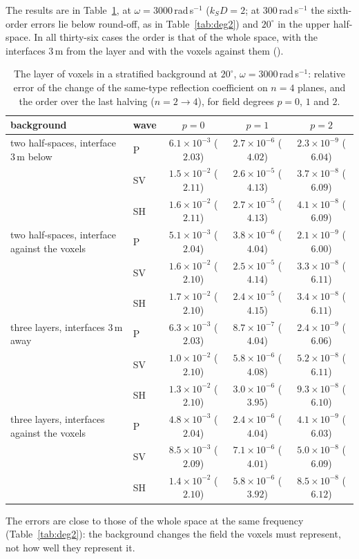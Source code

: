 \documentclass[preprint,review,12pt]{elsarticle}
\begin{document}
The results are in Table~\ref{tab:strat}, at $\omega=3000$\,rad\,s$^{-1}$ ($k_SD=2$; at
$300$\,rad\,s$^{-1}$ the sixth-order errors lie below round-off, as in Table~\ref{tab:deg2}) and
$20^\circ$ in the upper half-space. In all thirty-six cases the order is that of the whole space, with
the interfaces $3$\,m from the layer and with the voxels against them
().
\begin{table}[htbp]
\centering
\caption{The layer of voxels in a stratified background at $20^\circ$, $\omega=3000$\,rad\,s$^{-1}$:
relative error of the change of the same-type reflection coefficient on $n=4$ planes, and the order
over the last halving ($n=2\to4$), for field degrees $p=0$, $1$ and $2$.}\label{tab:strat}
\small\setlength{\tabcolsep}{4pt}
\begin{tabular}{@{}llccc@{}}
\toprule
background & wave & $p=0$ & $p=1$ & $p=2$ \\
\midrule
two half-spaces, interface $3$\,m below
 & P  & $6.1\times10^{-3}$ ($2.03$) & $2.7\times10^{-6}$ ($4.02$) & $2.3\times10^{-9}$ ($6.04$) \\
 & SV & $1.5\times10^{-2}$ ($2.11$) & $2.6\times10^{-5}$ ($4.13$) & $3.7\times10^{-8}$ ($6.09$) \\
 & SH & $1.6\times10^{-2}$ ($2.11$) & $2.7\times10^{-5}$ ($4.13$) & $4.1\times10^{-8}$ ($6.09$) \\
two half-spaces, interface against the voxels
 & P  & $5.1\times10^{-3}$ ($2.04$) & $3.8\times10^{-6}$ ($4.04$) & $2.1\times10^{-9}$ ($6.00$) \\
 & SV & $1.6\times10^{-2}$ ($2.10$) & $2.5\times10^{-5}$ ($4.14$) & $3.3\times10^{-8}$ ($6.11$) \\
 & SH & $1.7\times10^{-2}$ ($2.10$) & $2.4\times10^{-5}$ ($4.15$) & $3.4\times10^{-8}$ ($6.11$) \\
three layers, interfaces $3$\,m away
 & P  & $6.3\times10^{-3}$ ($2.03$) & $8.7\times10^{-7}$ ($4.04$) & $2.4\times10^{-9}$ ($6.06$) \\
 & SV & $1.0\times10^{-2}$ ($2.10$) & $5.8\times10^{-6}$ ($4.08$) & $5.2\times10^{-8}$ ($6.11$) \\
 & SH & $1.3\times10^{-2}$ ($2.10$) & $3.0\times10^{-6}$ ($3.95$) & $9.3\times10^{-8}$ ($6.10$) \\
three layers, interfaces against the voxels
 & P  & $4.8\times10^{-3}$ ($2.04$) & $2.4\times10^{-6}$ ($4.04$) & $4.1\times10^{-9}$ ($6.03$) \\
 & SV & $8.5\times10^{-3}$ ($2.09$) & $7.1\times10^{-6}$ ($4.01$) & $5.0\times10^{-8}$ ($6.09$) \\
 & SH & $1.4\times10^{-2}$ ($2.10$) & $5.8\times10^{-6}$ ($3.92$) & $8.5\times10^{-8}$ ($6.12$) \\
\bottomrule
\end{tabular}
\end{table}
The errors are close to those of the whole space at the same frequency (Table~\ref{tab:deg2}): the
background changes the field the voxels must represent, not how well they represent it. 
\end{document}
